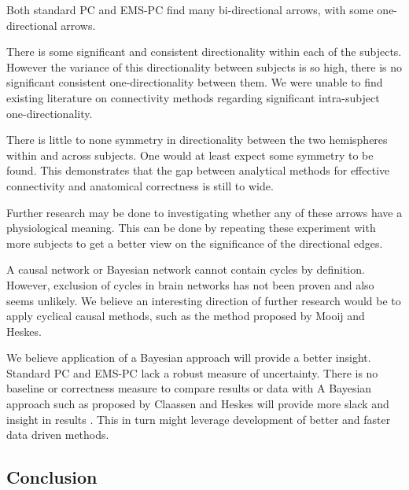 \documentclass[a4paper, 10pt, english, onecolumn]{article}
\begin{document}
Both standard PC and EMS-PC find many bi-directional arrows, with some one-directional arrows.

There is some significant and consistent directionality within each of the subjects.
However the variance of this directionality between subjects is so high, there is no significant consistent one-directionality between them.
We were unable to find existing literature on connectivity methods regarding significant intra-subject one-directionality.

There is little to none symmetry in directionality between the two hemispheres within and across subjects.
One would at least expect some symmetry to be found.
This demonstrates that the gap between analytical methods for effective connectivity and anatomical correctness is still to wide.

Further research may be done to investigating whether any of these arrows have a physiological meaning.
This can be done by repeating these experiment with more subjects to get a better view on the significance of the directional edges.

A causal network or Bayesian network cannot contain cycles by definition.
However, exclusion of cycles in brain networks has not been proven and also seems unlikely.
We believe an interesting direction of further research would be to apply cyclical causal methods, such as the method proposed by Mooij and Heskes\cite{Mooij20013}.

We believe application of a Bayesian approach will provide a better insight.
Standard PC and EMS-PC lack a robust measure of uncertainty.
There is no baseline or correctness measure to compare results or data with
A Bayesian approach such as proposed by Claassen and Heskes will provide more slack and insight in results \cite{claassen2012}.
This in turn might leverage development of better and faster data driven methods.



\subsection{Conclusion}
\end{document}
